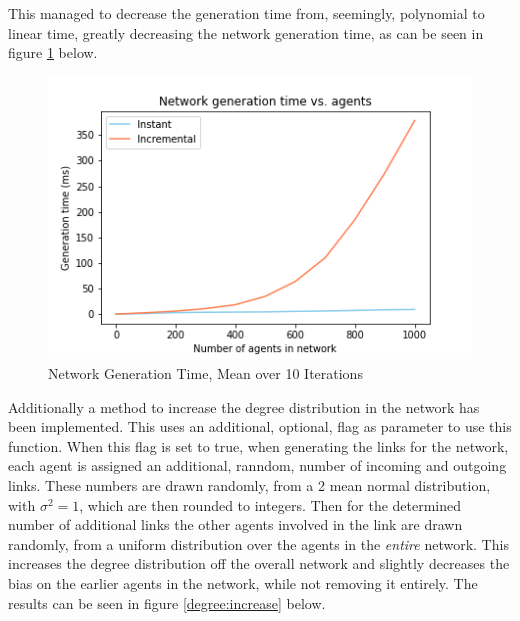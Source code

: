 \documentclass{article}
\begin{document}
This managed to decrease the generation time from, seemingly, polynomial to linear time, greatly decreasing the network generation time, as can be seen in figure \ref{time:2} below.
\begin{center}
    \begin{figure}[!htbp]
        \centering
        \includegraphics[width=1\textwidth]{ThesisKI/Images/GenTime2.png}
        \caption{Network Generation Time, Mean over 10 Iterations}
        \label{time:2}
    \end{figure}
\end{center}
\newpage
Additionally a method to increase the degree distribution in the network has been implemented. This uses an additional, optional, flag as parameter to use this function. When this flag is set to true, when generating the links for the network, each agent is assigned an additional, ranndom, number of incoming and outgoing links. These numbers are drawn randomly, from a 2 mean normal distribution, with $\sigma^2=1$, which are then rounded to integers. Then for the determined number of additional links the other agents involved in the link are drawn randomly, from a uniform distribution over the agents in the \emph{entire} network. This increases the degree distribution off the overall network and slightly decreases the bias on the earlier agents in the network, while not removing it entirely. The results can be seen in figure \ref{degree:increase} below.
\end{document}
